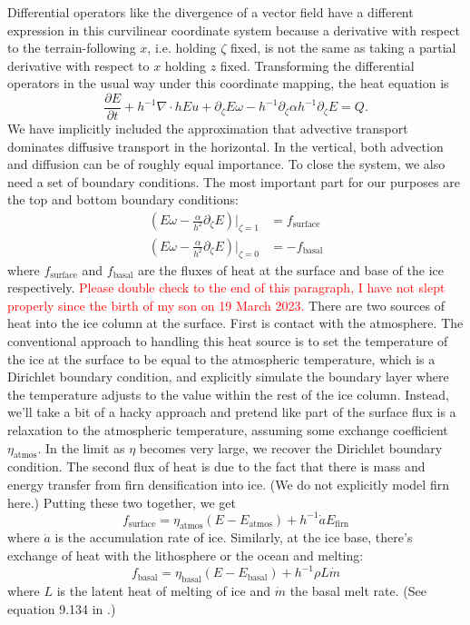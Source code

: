 \documentclass{article}
\theoremstyle{definition}
\theoremstyle{plain}
\begin{document}
Differential operators like the divergence of a vector field have a different expression in this curvilinear coordinate system because a derivative with respect to the terrain-following $x$, i.e. holding $\zeta$ fixed, is not the same as taking a partial derivative with respect to $x$ holding $z$ fixed.
Transforming the differential operators in the usual way under this coordinate mapping, the heat equation is
\begin{equation}
    \frac{\partial E}{\partial t} + h^{-1}\nabla\cdot hEu + \partial_\zeta E\omega - h^{-1}\partial_\zeta\alpha h^{-1}\partial_\zeta E = Q.
    \label{eq:differential-heat-equation-3d}
\end{equation}
We have implicitly included the approximation that advective transport dominates diffusive transport in the horizontal.
In the vertical, both advection and diffusion can be of roughly equal importance.
To close the system, we also need a set of boundary conditions.
The most important part for our purposes are the top and bottom boundary conditions:
\begin{align}
    \left(E\omega - \frac{\alpha}{h^2}\partial_\zeta E\right)|_{\zeta = 1} & = f_{\text{surface}} \\
    \left(E\omega - \frac{\alpha}{h^2}\partial_\zeta E\right)|_{\zeta = 0} & = -f_{\text{basal}}
\end{align}
where $f_{\text{surface}}$ and $f_{\text{basal}}$ are the fluxes of heat at the surface and base of the ice respectively.
\textcolor{red}{Please double check to the end of this paragraph, I have not slept properly since the birth of my son on 19 March 2023.}
There are two sources of heat into the ice column at the surface.
First is contact with the atmosphere.
The conventional approach to handling this heat source is to set the temperature of the ice at the surface to be equal to the atmospheric temperature, which is a Dirichlet boundary condition, and explicitly simulate the boundary layer where the temperature adjusts to the value within the rest of the ice column.
Instead, we'll take a bit of a hacky approach and pretend like part of the surface flux is a relaxation to the atmospheric temperature, assuming some exchange coefficient $\eta_{\text{atmos}}$.
In the limit as $\eta$ becomes very large, we recover the Dirichlet boundary condition.
The second flux of heat is due to the fact that there is mass and energy transfer from firn densification into ice.
(We do not explicitly model firn here.)
Putting these two together, we get
\begin{equation}
    f_{\text{surface}} = \eta_{\text{atmos}}(E - E_{\text{atmos}}) +  h^{-1}\dot a E_{\text{firn}}
    \label{eq:f-surface}
\end{equation}
where $\dot a$ is the accumulation rate of ice.
Similarly, at the ice base, there's exchange of heat with the lithosphere or the ocean and melting:
\begin{equation}
    f_{\text{basal}} = \eta_{\text{basal}}(E - E_{\text{basal}}) + h^{-1}\rho L\dot m
    \label{eq:f-basal}
\end{equation}
where $L$ is the latent heat of melting of ice and $\dot m$ the basal melt rate.
(See equation 9.134 in \citet{greve2009dynamics}.)
\end{document}
